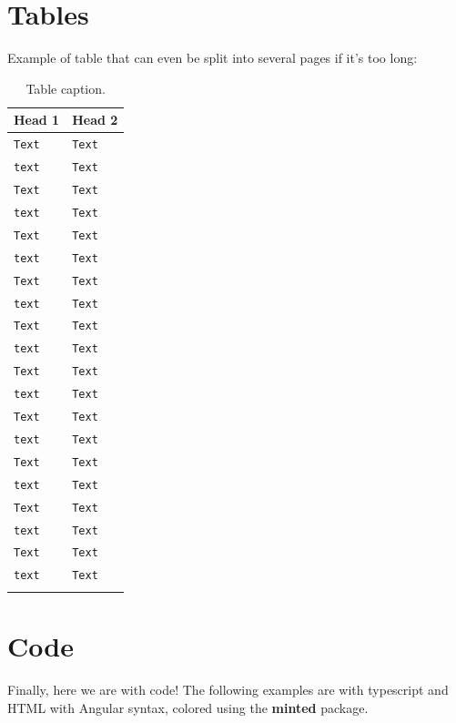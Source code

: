 \section{Tables}
Example of table that can even be split into several pages if it's too long:
\begin{longtable}{| l | l |}
    \hline
     \rowcolor[HTML]{F87C58}\textbf{Head 1} & \textbf{Head 2}\\
    \hline
    \endfirsthead%
    
    \texttt{Text} & \texttt{Text}\\
    \hline
    \texttt{text} & \texttt{Text}\\
    \hline
    \texttt{Text} & \texttt{Text}\\
    \hline
    \texttt{text} & \texttt{Text}\\
    \hline
    \texttt{Text} & \texttt{Text}\\
    \hline
    \texttt{text} & \texttt{Text}\\
    \hline
    \texttt{Text} & \texttt{Text}\\
    \hline
    \texttt{text} & \texttt{Text}\\
    \hline
    \texttt{Text} & \texttt{Text}\\
    \hline
    \texttt{text} & \texttt{Text}\\
    \hline
    \texttt{Text} & \texttt{Text}\\
    \hline
    \texttt{text} & \texttt{Text}\\
    \hline
    \texttt{Text} & \texttt{Text}\\
    \hline
    \texttt{text} & \texttt{Text}\\
    \hline
    \texttt{Text} & \texttt{Text}\\
    \hline
    \texttt{text} & \texttt{Text}\\
    \hline
    \texttt{Text} & \texttt{Text}\\
    \hline
    \texttt{text} & \texttt{Text}\\
    \hline
    \texttt{Text} & \texttt{Text}\\
    \hline
    \texttt{text} & \texttt{Text}\\
    \hline
    \caption{Table caption.}
\end{longtable}

\section{Code}
Finally, here we are with code! The following examples are with typescript and HTML with Angular syntax, colored using the \textbf{minted} package.

\begin{code}
    \inputminted{typescript}{listings/ts-example.ts}
    \caption{Caption for the typescript example.}
\end{code}
\vspace{4mm}

\begin{code}
    \inputminted{ng2}{listings/html-example.html}
    \caption{Caption for the HTML with Angular syntax example.}
\end{code}
\vspace{4mm}
